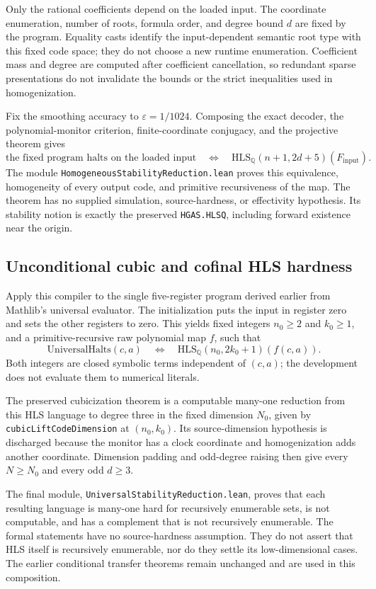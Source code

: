 \documentclass[11pt]{article}
\newcommand{\code}[1]{{\small\nolinkurl{#1}}}
\begin{document}
Only the rational coefficients depend on the loaded input. The coordinate
enumeration, number of roots, formula order, and degree bound $d$ are fixed
by the program. Equality casts identify the input-dependent semantic root
type with this fixed code space; they do not choose a new runtime
enumeration. Coefficient mass and degree are computed after coefficient
cancellation, so redundant sparse presentations do not invalidate the
bounds or the strict inequalities used in homogenization.

Fix the smoothing accuracy to $\varepsilon=1/1024$. Composing the exact
decoder, the polynomial-monitor criterion, finite-coordinate conjugacy,
and the projective theorem gives
\[
 \text{the fixed program halts on the loaded input}
 \quad\Longleftrightarrow\quad
 \mathrm{HLS}_{\mathbb Q}(n+1,2d+5)(F_{\mathrm{input}}).
\]
The module \code{HomogeneousStabilityReduction.lean} proves this equivalence,
homogeneity of every output code, and primitive recursiveness of the map.
The theorem has no supplied simulation, source-hardness, or effectivity
hypothesis. Its stability notion is exactly the preserved
\code{HGAS.HLSQ}, including forward existence near the origin.

\subsection{Unconditional cubic and cofinal HLS hardness}

Apply this compiler to the single five-register program derived earlier
from Mathlib's universal evaluator. The initialization puts the input in
register zero and sets the other registers to zero. This yields fixed
integers $n_0\ge2$ and $k_0\ge1$, and a primitive-recursive raw polynomial
map $f$, such that
\[
 \mathrm{UniversalHalts}(c,a)
 \quad\Longleftrightarrow\quad
 \mathrm{HLS}_{\mathbb Q}(n_0,2k_0+1)(f(c,a)).
\]
Both integers are closed symbolic terms independent of $(c,a)$; the
development does not evaluate them to numerical literals.

The preserved cubicization theorem is a computable many-one reduction
from this HLS language to degree three in the fixed dimension $N_0$,
given by \code{cubicLiftCodeDimension} at $(n_0,k_0)$. Its source-dimension
hypothesis is discharged because the monitor has a clock coordinate and
homogenization adds another coordinate. Dimension padding and odd-degree
raising then give every $N\ge N_0$ and every odd $d\ge3$.

The final module, \code{UniversalStabilityReduction.lean}, proves that
each resulting language is many-one hard for recursively enumerable
sets, is not computable, and has a complement that is not recursively
enumerable. The formal statements have no source-hardness assumption.
They do not assert that HLS itself is recursively enumerable, nor do
they settle its low-dimensional cases. The earlier conditional transfer
theorems remain unchanged and are used in this composition.
\end{document}
